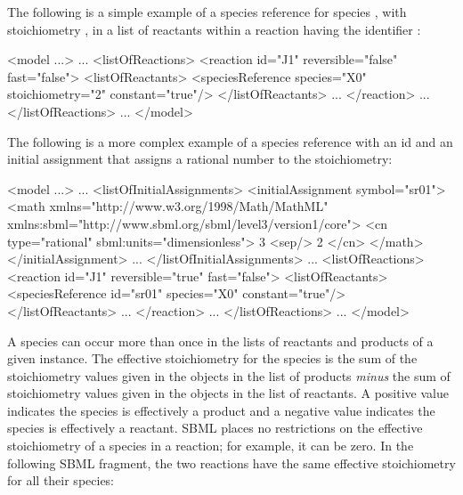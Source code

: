 The following is a simple example of a species reference for
species , with stoichiometry , in a list of
reactants within a reaction having the identifier :

\begin{example}
<model ...>
    ...
    <listOfReactions>
        <reaction id="J1" reversible="false" fast="false">
            <listOfReactants>
                <speciesReference species="X0" stoichiometry="2" constant="true"/>
            </listOfReactants>
            ...
        </reaction>
        ...
    </listOfReactions>
    ...
</model>
\end{example}

The following is a more complex example of a species reference
with an id  and an initial assignment that assigns a
rational number to the stoichiometry:

\begin{example}
<model ...>
    ...
    <listOfInitialAssignments>
        <initialAssignment symbol="sr01">
            <math xmlns="http://www.w3.org/1998/Math/MathML"
                  xmlns:sbml="http://www.sbml.org/sbml/level3/version1/core">
                <cn type="rational" sbml:units="dimensionless"> 3 <sep/> 2 </cn>
            </math>
        </initialAssignment>
        ...
    </listOfInitialAssignments>
        ...
    <listOfReactions>
        <reaction id="J1" reversible="true" fast="false">
            <listOfReactants>
                <speciesReference id="sr01" species="X0" constant="true"/>
            </listOfReactants>
            ...
        </reaction>
        ...
    </listOfReactions>
    ...
</model>
\end{example}


A species can occur more than once in the lists of reactants and
products of a given \Reaction instance.  The effective
stoichiometry for the species is the sum of the stoichiometry
values given in the \SpeciesReference objects in the list of
products \emph{minus} the sum of stoichiometry values given in the
\SpeciesReference objects in the list of reactants.  A positive
value indicates the species is effectively a product and a
negative value indicates the species is effectively a reactant.
SBML places no restrictions on the effective stoichiometry of a
species in a reaction; for example, it can be zero.  In the
following SBML fragment, the two reactions have the same effective
stoichiometry for all their species:

